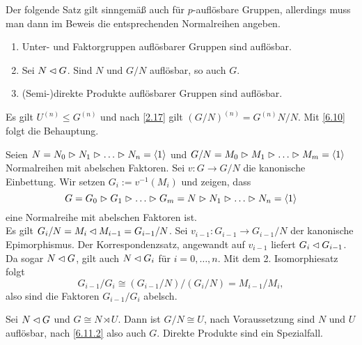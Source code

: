 Der folgende Satz gilt sinngem\"a\ss{} auch f\"ur $p$-aufl\"osbare Gruppen, allerdings muss man dann im Beweis die entsprechenden Normalreihen angeben.
\begin{satz}\spspace \label{6.11} 
\begin{enumerate}
 \item Unter- und Faktorgruppen aufl\"osbarer Gruppen sind aufl\"osbar.
 \item Sei $N\lhd G$. Sind $N$ und $G/N$ aufl\"osbar, so auch $G$. \label{6.11.2}
 \item (Semi-)direkte Produkte aufl\"osbarer Gruppen sind aufl\"osbar.
\end{enumerate}

\end{satz}

\begin{beweis}\spspace
 \item Es gilt $U^{(n)}\leq G^{(n)}$ und nach \ref{2.17} gilt $(G/N)^{(n)} = G^{(n)}N/N$. Mit \ref{6.10} folgt die Behauptung.
 \item Seien $N=N_0\vartriangleright N_1\vartriangleright\ldots\vartriangleright N_n = \langle 1 \rangle$ und $G/N=M_0\vartriangleright M_1\vartriangleright\ldots\vartriangleright M_m=\langle 1 \rangle$ Normalreihen mit abelschen Faktoren. Sei $v:G\to G/N$ die kanonische Einbettung. Wir setzen $G_i:=v^{-1}(M_i)$ und zeigen, dass $$G=G_0\vartriangleright G_1\vartriangleright\ldots\vartriangleright G_m = N\vartriangleright N_1\vartriangleright \ldots \vartriangleright N_n=\langle 1 \rangle$$ eine Normalreihe mit abelschen Faktoren ist. \\
Es gilt $G_i/N = M_i\lhd M_{i-1}=G_{i-1}/N$. Sei $v_{i-1}:G_{i-1}\to G_{i-1}/N$ der kanonische Epimorphismus. Der Korrespondenzsatz, angewandt auf $v_{i-1}$ liefert $G_i\lhd G_{i-1}$. Da sogar $N\lhd G$, gilt auch $N\lhd G_i$ f\"ur $i=0,\ldots,n$.
Mit dem 2. Isomorphiesatz folgt
$$G_{i-1}/G_i\cong (G_{i-1}/N)/(G_i/N)=M_{i-1}/M_i,$$ also sind die Faktoren $G_{i-1}/G_i$ abelsch.
\item Sei $N\lhd G$ und $G\cong N\rtimes U$. Dann ist $G/N\cong U$, nach Voraussetzung sind $N$ und $U$ aufl\"osbar, nach \ref{6.11.2} also auch $G$. Direkte Produkte sind ein Spezialfall.
\end{beweis}
